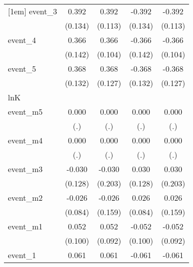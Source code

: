 {\begin{tabular}{l*{4}{c}}
[1em]
event\_3     &       0.392\sym{**} &       0.392\sym{***}&      -0.392\sym{**} &      -0.392\sym{***}\\
            &     (0.134)         &     (0.113)         &     (0.134)         &     (0.113)         \\
[1em]
event\_4     &       0.366\sym{**} &       0.366\sym{***}&      -0.366\sym{**} &      -0.366\sym{***}\\
            &     (0.142)         &     (0.104)         &     (0.142)         &     (0.104)         \\
[1em]
event\_5     &       0.368\sym{**} &       0.368\sym{**} &      -0.368\sym{**} &      -0.368\sym{**} \\
            &     (0.132)         &     (0.127)         &     (0.132)         &     (0.127)         \\
\hline
lnK         &                     &                     &                     &                     \\
event\_m5    &       0.000         &       0.000         &       0.000         &       0.000         \\
            &         (.)         &         (.)         &         (.)         &         (.)         \\
[1em]
event\_m4    &       0.000         &       0.000         &       0.000         &       0.000         \\
            &         (.)         &         (.)         &         (.)         &         (.)         \\
[1em]
event\_m3    &      -0.030         &      -0.030         &       0.030         &       0.030         \\
            &     (0.128)         &     (0.203)         &     (0.128)         &     (0.203)         \\
[1em]
event\_m2    &      -0.026         &      -0.026         &       0.026         &       0.026         \\
            &     (0.084)         &     (0.159)         &     (0.084)         &     (0.159)         \\
[1em]
event\_m1    &       0.052         &       0.052         &      -0.052         &      -0.052         \\
            &     (0.100)         &     (0.092)         &     (0.100)         &     (0.092)         \\
[1em]
event\_1     &       0.061         &       0.061         &      -0.061         &      -0.061         \\

\end{tabular}}
